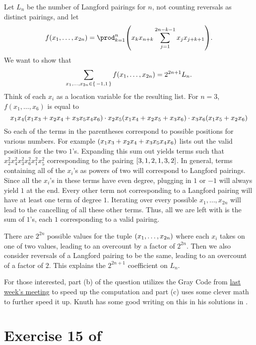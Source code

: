 \documentclass[letterpaper]{article}
\begin{document}
Let $L_{n}$ be the number of Langford pairings for $n$, not counting reversals as distinct pairings, and let
\[
    f(x_{1}, \ldots, x_{2n}) = \prod_{k = 1}^{n} \pqty{x_{k} x_{n+k} \sum_{j = 1}^{2n - k - 1} x_{j} x_{j+k+1}}.
\]
We want to show that
\[
    \sum_{x_{1}, \ldots, x_{2n} \in \set{-1, 1}} f(x_{1}, \ldots, x_{2n}) = 2^{2n + 1} L_{n}.
\]
Think of each $x_{i}$ as a location variable for the resulting list. For $n = 3$, $f(x_{1}, \ldots, x_{6})$ is equal to
\[
    x_{1} x_{4} \pqty{x_{1} x_{3} + x_{2} x_{4} + x_{3} x_{5} x_{4} x_{6}} \cdot x_{2} x_{5} \pqty{x_{1} x_{4} + x_{2} x_{5} + x_{3} x_{6}} \cdot x_{3} x_{6} \pqty{x_{1} x_{5} + x_{2} x_{6}}
\]
So each of the terms in the parentheses correspond to possible positions for various numbers.
For example $\pqty{x_{1} x_{3} + x_{2} x_{4} + x_{3} x_{5} x_{4} x_{6}}$ lists out the valid positions for the two $1$'s.
Expanding this sum out yields terms such that $x_{2}^{2} x_{4}^{2} x_{3}^{2} x_{6}^{2} x_{1}^{2} x_{5}^{2}$ corresponding to the pairing $\bqty{3, 1, 2, 1, 3, 2}$.
In general, terms containing all of the $x_{i}$'s as powers of two will correspond to Langford pairings.
Since all the $x_{i}$'s in these terms have even degree, plugging in $1$ or $-1$ will always yield $1$ at the end.
Every other term not corresponding to a Langford pairing will have at least one term of degree $1$.
Iterating over every possible $x_{1}, \ldots, x_{2n}$ will lead to the cancelling of all these other terms.
Thus, all we are left with is the sum of $1$'s, each $1$ corresponding to a valid pairing.

There are $2^{2n}$ possible values for the tuple $\pqty{x_{1}, \ldots, x_{2n}}$ where each $x_{i}$ takes on one of two values, leading to an overcount by a factor of $2^{2n}$.
Then we also consider reversals of a Langford pairing to be the same, leading to an overcount of a factor of $2$.
This explains the $2^{2n + 1}$ coefficient on $L_{n}$.

For those interested, part (b) of the question utilizes the Gray Code from \href{https://www.cstheory.org/meetings/sp23/binary/slides.pdf}{last week's meeting} to speed up the computation and part (c) uses some clever math to further speed it up.
Knuth has some good writing on this in his solutions in \cite{TAOCP4A}.

\clearpage

\section*{Exercise 15 of \cite[Chapter~7.2.2.1]{TAOCP4B}}
\end{document}
